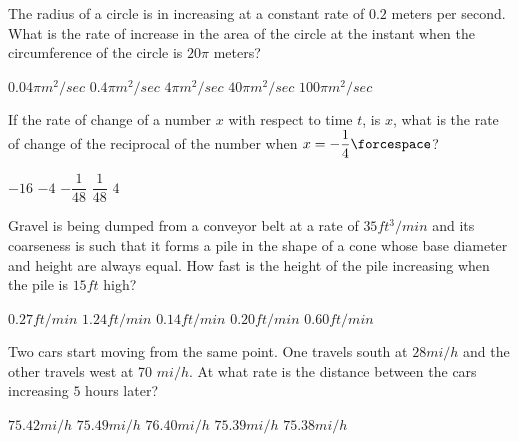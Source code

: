 \begin{questions}
    \question The radius of a circle is in increasing at a constant rate of $0.2$ meters per second. What is the rate of increase in the area of the circle at the instant when the circumference of the circle is $20\pi$ meters? \\

    \begin{oneparchoices}
        \choice $0.04\pi \si{m^2 \per sec}$
        \choice $0.4\pi \si{m^2 \per sec}$
        \choice $4\pi \si{m^2 \per sec}$
        \choice $40\pi \si{m^2 \per sec}$
        \choice $100\pi \si{m^2 \per sec}$
    \end{oneparchoices} \par \horizontalline

    \question If the rate of change of a number $x$ with respect to time $t$, is $x$, what is the rate of change of the reciprocal of the number when $x = -\dfrac{1}{4} \forcespace$? \\

    \begin{oneparchoices}
        \choice $-16$
        \choice $-4$
        \choice $-\dfrac{1}{48}$
        \choice $\dfrac{1}{48}$
        \choice $4$
    \end{oneparchoices} \par \horizontalline

    \question Gravel is being dumped from a conveyor belt at a rate of $35 \si{ft^3 \per min}$ and its coarseness is such that it forms a pile in the shape of a cone whose base diameter and height are always equal. How fast is the height of the pile increasing when the pile is $15 \si{ft}$ high? \\

    \begin{oneparchoices}
        \choice $0.27 \si{ft \per min}$
        \choice $1.24 \si{ft \per min}$
        \choice $0.14 \si{ft \per min}$
        \choice $0.20 \si{ft \per min}$
        \choice $0.60 \si{ft \per min}$
    \end{oneparchoices} \par \horizontalline

    \question Two cars start moving from the same point. One travels south at $28 \si{mi \per h}$ and the other travels west at 70 $\si{mi \per h}$. At what rate is the distance between the cars increasing $5$ hours later? \\

    \begin{oneparchoices}
        \choice $75.42 \si{mi \per h}$
        \choice $75.49 \si{mi \per h}$
        \choice $76.40 \si{mi \per h}$
        \choice $75.39 \si{mi \per h}$
        \choice $75.38 \si{mi \per h}$
    \end{oneparchoices} \par \horizontalline


\end{questions}
